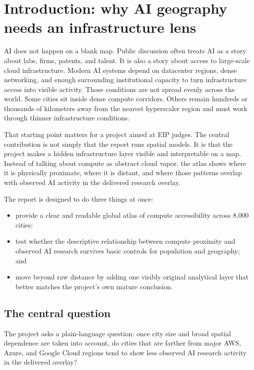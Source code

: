 \documentclass[11pt]{article}
\begin{document}
\section{Introduction: why AI geography needs an infrastructure lens}
AI does not happen on a blank map. Public discussion often treats AI as a story about labs, firms, patents, and talent. It is also a story about access to large-scale cloud infrastructure. Modern AI systems depend on datacenter regions, dense networking, and enough surrounding institutional capacity to turn infrastructure access into visible activity. Those conditions are not spread evenly across the world. Some cities sit inside dense compute corridors. Others remain hundreds or thousands of kilometers away from the nearest hyperscaler region and must work through thinner infrastructure conditions.

That starting point matters for a project aimed at EIP judges. The central contribution is not simply that the report runs spatial models. It is that the project makes a hidden infrastructure layer visible and interpretable on a map. Instead of talking about compute as abstract cloud vapor, the atlas shows where it is physically proximate, where it is distant, and where those patterns overlap with observed AI activity in the delivered research overlay.

The report is designed to do three things at once:
\begin{itemize}[leftmargin=*]
  \item provide a clear and readable global atlas of compute accessibility across 8,000 cities;
  \item test whether the descriptive relationship between compute proximity and observed AI research survives basic controls for population and geography; and
  \item move beyond raw distance by adding one visibly original analytical layer that better matches the project’s own mature conclusion.
\end{itemize}

\subsection{The central question}
The project asks a plain-language question: once city size and broad spatial dependence are taken into account, do cities that are farther from major AWS, Azure, and Google Cloud regions tend to show less observed AI research activity in the delivered overlay?
\end{document}
